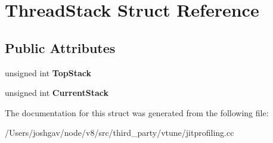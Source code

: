 \hypertarget{struct_thread_stack}{}\section{Thread\+Stack Struct Reference}
\label{struct_thread_stack}
\subsection*{Public Attributes}
\begin{DoxyCompactItemize}
\item 
unsigned int {\bfseries Top\+Stack}\hypertarget{struct_thread_stack_a04b1a308e0995dfb38ab967929a0fc5f}{}\label{struct_thread_stack_a04b1a308e0995dfb38ab967929a0fc5f}

\item 
unsigned int {\bfseries Current\+Stack}\hypertarget{struct_thread_stack_af7885747136b2ac6f58da881307e72b4}{}\label{struct_thread_stack_af7885747136b2ac6f58da881307e72b4}

\end{DoxyCompactItemize}


The documentation for this struct was generated from the following file\+:\begin{DoxyCompactItemize}
\item 
/\+Users/joshgav/node/v8/src/third\+\_\+party/vtune/jitprofiling.\+cc\end{DoxyCompactItemize}
